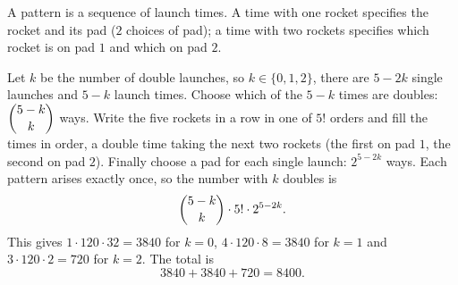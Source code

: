 A pattern is a sequence of launch times. A time with one rocket specifies the rocket and its pad ($2$ choices of pad); a time with two rockets specifies which rocket is on pad $1$ and which on pad $2$.

Let $k$ be the number of double launches, so $k\in\{0,1,2\}$, there are $5-2k$ single launches and $5-k$ launch times. Choose which of the $5-k$ times are doubles: $\dbinom{5-k}{k}$ ways. Write the five rockets in a row in one of $5!$ orders and fill the times in order, a double time taking the next two rockets (the first on pad $1$, the second on pad $2$). Finally choose a pad for each single launch: $2^{5-2k}$ ways. Each pattern arises exactly once, so the number with $k$ doubles is
\[
\dbinom{5-k}{k}\cdot5!\cdot2^{5-2k}.
\]
This gives $1\cdot120\cdot32=3840$ for $k=0$, $4\cdot120\cdot8=3840$ for $k=1$ and $3\cdot120\cdot2=720$ for $k=2$. The total is
\[
3840+3840+720=\boxed{8400}.
\]
